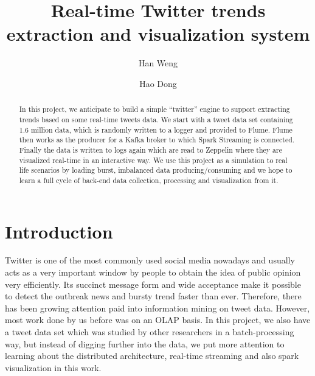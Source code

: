 \documentclass[manuscript, review, screen]{acmart}
\begin{document}
\title{Real-time Twitter trends extraction and visualization system}

\author{Han Weng}
\author{Hao Dong}
\authornotemark[1]


\renewcommand{\shortauthors}{H. Weng and H. Dong (CS631)}

\begin{abstract}
In this project, we anticipate to build a simple ``twitter'' engine to support extracting trends based on some real-time tweets data. We start with a tweet data set containing 1.6 million data, which is randomly written to a logger and provided to Flume. Flume then works as the producer for a Kafka broker to which Spark Streaming is connected. Finally the data is written to logs again which are read to Zeppelin where they are visualized real-time in an interactive way. We use this project as a simulation to real life scenarios by loading burst, imbalanced data producing/consuming and we hope to learn a full cycle of back-end data collection, processing and visualization from it. 
\end{abstract}


\maketitle

\section{Introduction}
Twitter is one of the most commonly used social media nowadays and usually acts as a very important window by people to obtain the idea of public opinion very efficiently. Its succinct message form and wide acceptance make it possible to detect the outbreak news and bursty trend faster than ever. Therefore, there has been growing attention paid into information mining on tweet data. However, most work done by us before was on an OLAP basis. In this project, we also have a tweet data set which was studied by other researchers in a batch-processing way, but instead of digging further into the data, we put more attention to learning about the distributed architecture, real-time streaming and also spark visualization in this work. 
\end{document}
